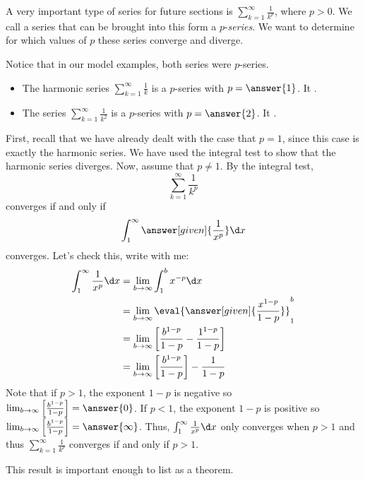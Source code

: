 \documentclass{ximera}
\begin{document}
A very important type of series for future sections is $\sum_{k=1}^\infty \frac{1}{k^p}$, where $p>0$.  We call a series that can be brought into this form a $p$-\emph{series}.  We want to determine for which values of $p$ these series converge and diverge.

Notice that in our model examples, both series were $p$-series.

\begin{itemize}
\item The harmonic series $\sum_{k=1}^{\infty} \frac{1}{k}$ is a $p$-series with $p = \answer{1}$.  It .
\item The series $\sum_{k=1}^{\infty} \frac{1}{k^2}$ is a $p$-series with $p = \answer{2}$. It .
\end{itemize}
  
 \begin{explanation}
    First, recall that we have already dealt with the case that $p = 1$, since 
    this case is exactly the harmonic series.  We have used the integral test 
    to show that the harmonic series diverges.
    Now, assume that $p \ne 1$.  By the integral test,
    \[
    \sum_{k=1}^\infty \frac{1}{k^p}
    \]
    converges if and only if
    \[
    \int_1^\infty \answer[given]{\frac{1}{x^p}} \d x
    \]
    converges. Let's check this, write with me:
    \begin{align*}
      \int_1^\infty \frac{1}{x^p} \d x &= \lim_{b\to\infty} \int_1^b x^{-p} \d x\\
      &= \lim_{b\to\infty} \eval{\answer[given]{\frac{x^{1-p}}{1-p}}}_1^b\\
      &= \lim_{b\to\infty} \left[ \frac{b^{1-p}}{1-p} - \frac{1^{1-p}}{1-p} \right] \\
      &= \lim_{b\to\infty} \left[\frac{b^{1-p}}{1-p}\right] - \frac{1}{1-p}
    \end{align*}
Note that if $p >1$, the exponent $1-p$ is negative so $ \lim_{b\to\infty} \left[\frac{b^{1-p}}{1-p}\right] = \answer{0}$.   If $p <1$, the exponent $1-p$ is positive so $ \lim_{b\to\infty} \left[\frac{b^{1-p}}{1-p}\right] = \answer{\infty}$.  Thus, $  \int_1^\infty \frac{1}{x^p} \d x$  only converges when $p>1$ and thus  $\sum_{k=1}^\infty \frac{1}{k^p}$ converges if and only if $p>1$.
  \end{explanation}

This result is important enough to list as a theorem.
\end{document}
